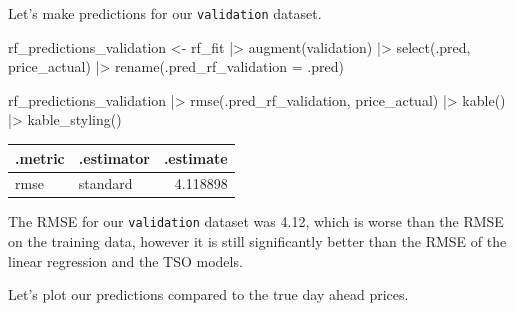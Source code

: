 \documentclass[
]{article}
\newenvironment{Shaded}{\begin{snugshade}}{\end{snugshade}}
\newcommand{\AttributeTok}[1]{\textcolor[rgb]{0.40,0.45,0.13}{#1}}
\newcommand{\FunctionTok}[1]{\textcolor[rgb]{0.28,0.35,0.67}{#1}}
\newcommand{\NormalTok}[1]{\textcolor[rgb]{0.00,0.23,0.31}{#1}}
\newcommand{\OtherTok}[1]{\textcolor[rgb]{0.00,0.23,0.31}{#1}}
\newcommand{\SpecialCharTok}[1]{\textcolor[rgb]{0.37,0.37,0.37}{#1}}
\begin{document}
Let's make predictions for our \texttt{validation} dataset.

\begin{Shaded}
\begin{Highlighting}[]
\NormalTok{rf\_predictions\_validation }\OtherTok{\textless{}{-}}\NormalTok{ rf\_fit }\SpecialCharTok{|\textgreater{}}
  \FunctionTok{augment}\NormalTok{(validation) }\SpecialCharTok{|\textgreater{}}
  \FunctionTok{select}\NormalTok{(.pred, price\_actual) }\SpecialCharTok{|\textgreater{}}
  \FunctionTok{rename}\NormalTok{(}\AttributeTok{.pred\_rf\_validation =}\NormalTok{ .pred)}

\NormalTok{rf\_predictions\_validation }\SpecialCharTok{|\textgreater{}}
  \FunctionTok{rmse}\NormalTok{(.pred\_rf\_validation, price\_actual) }\SpecialCharTok{|\textgreater{}}
  \FunctionTok{kable}\NormalTok{() }\SpecialCharTok{|\textgreater{}}
  \FunctionTok{kable\_styling}\NormalTok{()}
\end{Highlighting}
\end{Shaded}

\begin{longtable*}[t]{llr}
\toprule
.metric & .estimator & .estimate\\
\midrule
rmse & standard & 4.118898\\
\bottomrule
\end{longtable*}

The RMSE for our \texttt{validation} dataset was 4.12, which is worse
than the RMSE on the training data, however it is still significantly
better than the RMSE of the linear regression and the TSO models.

Let's plot our predictions compared to the true day ahead prices.
\end{document}
